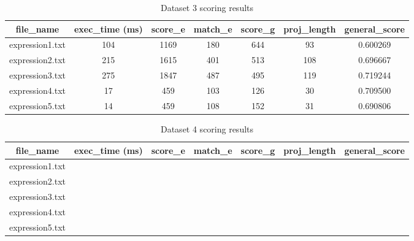 \documentclass[12pt,a4paper]{article}
\begin{document}
\begin{table}[H]
	\begin{center}
		\caption{Dataset 3 scoring results}
		\begin{tabular}{|c|c|c|c|c|c|c|}
			\hline
			\textbf{file\_name} & \textbf{exec\_time} (ms) & \textbf{score\_e} & \textbf{match\_e} & \textbf{score\_g} & \textbf{proj\_length} & \textbf{general\_score} \\
			\hline\hline
			expression1.txt & 104 & 1169 & 180 & 644 & 93  & 0.600269 \\
			\hline
			expression2.txt & 215 & 1615 & 401 & 513 & 108 & 0.696667 \\
			\hline
			expression3.txt & 275 & 1847 & 487 & 495 & 119 & 0.719244 \\
			\hline
			expression4.txt & 17  & 459  & 103 & 126 & 30  & 0.709500 \\
			\hline
			expression5.txt & 14  & 459  & 108 & 152 & 31  & 0.690806 \\
			\hline
		\end{tabular}
	\end{center}
\end{table}

\begin{table}[H]
	\begin{center}
		\caption{Dataset 4 scoring results}
		\begin{tabular}{|c|c|c|c|c|c|c|}
			\hline
			\textbf{file\_name} & \textbf{exec\_time} (ms) & \textbf{score\_e} & \textbf{match\_e} & \textbf{score\_g} & \textbf{proj\_length} & \textbf{general\_score} \\
			\hline\hline
			expression1.txt &  &  &  &  &  &  \\
			\hline
			expression2.txt &  &  &  &  &  &  \\
			\hline
			expression3.txt &  &  &  &  &  &  \\
			\hline
			expression4.txt &  &  &  &  &  &  \\
			\hline
			expression5.txt &  &  &  &  &  &  \\
			\hline
		\end{tabular}
	\end{center}
\end{table}
\end{document}
